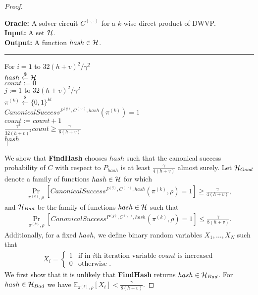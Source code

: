 \begin{proof}
\begin{codeblock}
  \textbf{Oracle:} A solver circuit $C^{(\cdot, \cdot)}$ for a $k$-wise direct product of DWVP. \\
  \textbf{Input:} A set $\mathcal{H}$.\\
  \textbf{Output:} A function $hash \in \mathcal{H}$.
  \medskip\hrule\medskip
  For $i = 1$ to $32(h+v)^2/\gamma^2$ \\
  \IndI $hash \xleftarrow{\$} \mathcal{H}$ \\
  \IndI $count := 0$ \\
  \IndI \For $j := 1$ to $32(h+v)^2/\gamma^2$ \\
  \IndII $\pi^{(k)} \xleftarrow{\$} \{0,1\}^{kl} $\\
  \IndII \If $CanonicalSuccess^{P^{(g)}, C^{(\cdot, \cdot)}, hash}(\pi^{(k)}) = 1$ \then \\
  \IndIII $count := count + 1$\\
  \IndI \If $\frac{\gamma^2}{32(h+v)^2} count \geq \frac{\gamma}{6(h+v)}$ \\
  \IndII \return $hash$\\
  \return $\bot$
\end{codeblock}
We show that \textbf{FindHash} chooses $hash$ such
that the canonical success probability of $C$
with respect to $P_{hash}$ is at least $\frac{\gamma}{4(h+v)}$ almost surely.
Let $\mathcal{H}_{Good}$ denote a family of functions $hash \in \mathcal{H}$ for which
\begin{align*}
\underset{\pi^{(k)}, \rho}{\Pr}\left[CanonicalSuccess^{P^{(g)}, C^{(\cdot, \cdot)}, hash}(\pi^{(k)}, \rho) = 1\right] \geq \frac{\gamma}{4(h+v)},
\end{align*}
and $\mathcal{H}_{Bad}$ be the family of functions $hash \in \mathcal{H}$ such that
\begin{align*}
\underset{\pi^{(k)}, \rho}{\Pr}\left[CanonicalSuccess^{P^{(g)}, C^{(\cdot, \cdot)}, hash}(\pi^{(k)}, \rho) = 1\right] \leq \frac{\gamma}{8(h+v)}.
\end{align*}
Additionally, for a fixed $hash$, we define binary random variables $X_1, \dots, X_N$ such that
\begin{align*}
  X_i =
  \begin{cases}
    1 & \text{if in $i$th iteration variable $count$ is increased}\\
    0 & \text{otherwise .}
  \end{cases}
\end{align*}
We first show that it is unlikely that \textbf{FindHash} returns $hash \in \mathcal{H}_{Bad}$.
For $hash \in \mathcal{H}_{Bad}$ we have $\mathbb{E}_{\pi^{(k)},\rho}[X_i] < \frac{\gamma}{8(h+v)}$.

\end{proof}
